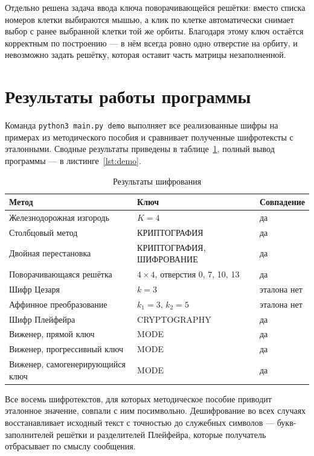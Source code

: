 \documentclass[14pt,a4paper]{extarticle}
\begin{document}
Отдельно решена задача ввода ключа поворачивающейся решётки: вместо списка номеров
клетки выбираются мышью, а клик по клетке автоматически снимает выбор с ранее выбранной
клетки той же орбиты. Благодаря этому ключ остаётся корректным по построению --- в нём
всегда ровно одно отверстие на орбиту, и невозможно задать решётку, которая оставит
часть матрицы незаполненной.

\section{Результаты работы программы}

Команда \texttt{python3 main.py demo} выполняет все реализованные шифры на примерах из
методического пособия и сравнивает полученные шифротексты с эталонными. Сводные
результаты приведены в таблице~\ref{tab:results}, полный вывод программы ---
в листинге~\ref{lst:demo}.

\begin{table}[H]
\caption{Результаты шифрования}
\label{tab:results}
\centering
\begin{tabularx}{\textwidth}{lXl}
\toprule
Метод & Ключ & Совпадение \\
\midrule
Железнодорожная изгородь & $K = 4$ & да \\
Столбцовый метод & КРИПТОГРАФИЯ & да \\
Двойная перестановка & КРИПТОГРАФИЯ, ШИФРОВАНИЕ & да \\
Поворачивающаяся решётка & $4 \times 4$, отверстия 0, 7, 10, 13 & да \\
Шифр Цезаря & $k = 3$ & эталона нет \\
Аффинное преобразование & $k_1 = 3$, $k_2 = 5$ & эталона нет \\
Шифр Плейфейра & CRYPTOGRAPHY & да \\
Виженер, прямой ключ & MODE & да \\
Виженер, прогрессивный ключ & MODE & да \\
Виженер, самогенерирующийся ключ & MODE & да \\
\bottomrule
\end{tabularx}
\end{table}

Все восемь шифротекстов, для которых методическое пособие приводит эталонное значение,
совпали с ним посимвольно. Дешифрование во всех случаях восстанавливает исходный текст
с точностью до служебных символов --- букв-заполнителей решётки и разделителей
Плейфейра, которые получатель отбрасывает по смыслу сообщения.
\end{document}
